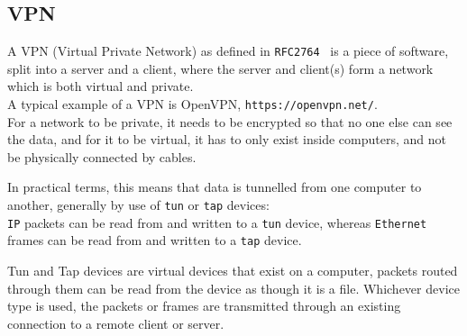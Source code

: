 \subsection{VPN}
A VPN (Virtual Private Network) as defined in \texttt{RFC2764}~\cite{rfc2764} is a piece of software, split into a server and a client, where the server and client\@(s) form a network which is both virtual and private.\\
A typical example of a VPN is OpenVPN, \texttt{https://openvpn.net/}.\\
For a network to be private, it needs to be encrypted so that no one else can see the data, and for it to be virtual, it has to only exist inside computers, and not be physically connected by cables.\par In practical terms, this means that data is tunnelled from one computer to another, generally by use of \texttt{tun} or \texttt{tap} devices:\\
\texttt{IP} packets can be read from and written to a \texttt{tun} device, whereas \texttt{Ethernet} frames can be read from and written to a \texttt{tap} device.\par
Tun and Tap devices are virtual devices that exist on a computer, packets routed through them can be read from the device as though it is a file.
Whichever device type is used, the packets or frames are transmitted through an existing connection to a remote client or server.
